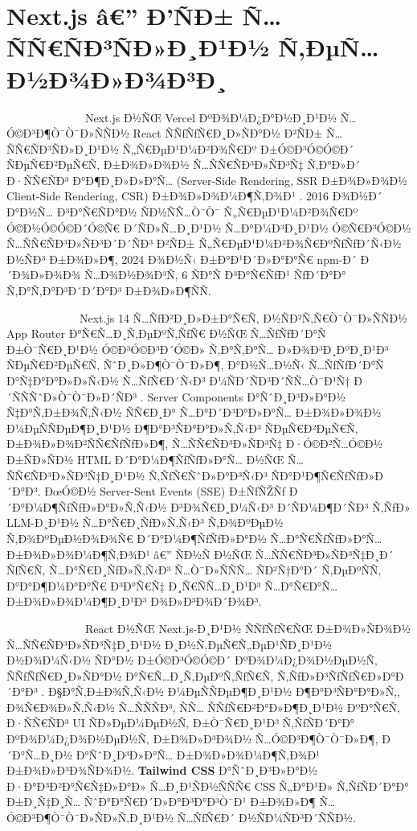 \documentclass[12pt,A4]{report}
\begin{document}
\section{Next.js â€” Ð’ÑÐ± Ñ…ÑÑ€ÑÐ³ÑÐ»Ð¸Ð¹Ð½ Ñ‚ÐµÑ…Ð½Ð¾Ð»Ð¾Ð³Ð¸}

\ \ \ \ \ \ \ \ \  \ \ \ \ \ Next.js Ð½ÑŒ Vercel ÐºÐ¾Ð¼Ð¿Ð°Ð½Ð¸Ð¹Ð½ Ñ…Ó©Ð³Ð¶Ò¯Ò¯Ð»ÑÑÐ½
React ÑÑƒÑƒÑ€Ð¸Ð»ÑÐ°Ð½ Ð²ÑÐ± Ñ…ÑÑ€ÑÐ³ÑÐ»Ð¸Ð¹Ð½ Ñ„Ñ€ÐµÐ¹Ð¼Ð²Ð¾Ñ€Ðº Ð±Ó©Ð³Ó©Ó©Ð´ ÑÐµÑ€Ð²ÐµÑ€Ñ‚ Ð±Ð¾Ð»Ð¾Ð½
Ñ…ÑÑ€ÑÐ³Ð»ÑÐ³Ñ‡ Ñ‚Ð°Ð»Ð´ Ð·ÑÑ€ÑÐ³ Ð°Ð¶Ð¸Ð»Ð»Ð°Ñ… (Server-Side Rendering, SSR Ð±Ð¾Ð»Ð¾Ð½
Client-Side Rendering, CSR) Ð±Ð¾Ð»Ð¾Ð¼Ð¶Ñ‚Ð¾Ð¹ \cite{nextjs2024}. 2016 Ð¾Ð½Ð´
Ð°Ð½Ñ… Ð³Ð°Ñ€ÑÐ°Ð½ ÑÐ½ÑÑ…Ò¯Ò¯ Ñ„Ñ€ÐµÐ¹Ð¼Ð²Ð¾Ñ€Ðº Ó©Ð½Ó©Ó©Ð´Ó©Ñ€ Ð´ÑÐ»Ñ…Ð¸Ð¹Ð½ Ñ…Ð°Ð¼Ð³Ð¸Ð¹Ð½ Ó©Ñ€Ð³Ó©Ð½
Ñ…ÑÑ€ÑÐ³Ð»ÑÐ³Ð´Ð´ÑÐ³ Ð²ÑÐ± Ñ„Ñ€ÐµÐ¹Ð¼Ð²Ð¾Ñ€ÐºÑƒÑƒÐ´Ñ‹Ð½ Ð½ÑÐ³ Ð±Ð¾Ð»Ð¶, 2024 Ð¾Ð½Ñ‹ Ð±Ð°Ð¹Ð´Ð»Ð°Ð°Ñ€
npm-Ð´ Ð´Ð¾Ð»Ð¾Ð¾ Ñ…Ð¾Ð½Ð¾Ð³Ñ‚ 6 ÑÐ°Ñ Ð³Ð°Ñ€ÑƒÐ¹ ÑƒÐ´Ð°Ð° Ñ‚Ð°Ñ‚Ð°Ð³Ð´Ð´Ð°Ð³ Ð±Ð¾Ð»Ð¶ÑÑ.

\ \ \ \ \ \ \ \ \  \ \ \ \ Next.js 14 Ñ…ÑƒÐ²Ð¸Ð»Ð±Ð°Ñ€Ñ‚ Ð½ÑÐ²Ñ‚Ñ€Ò¯Ò¯Ð»ÑÑÐ½
App Router Ð°Ñ€Ñ…Ð¸Ñ‚ÐµÐºÑ‚ÑƒÑ€ Ð½ÑŒ Ñ…ÑƒÑƒÐ´Ð°Ñ Ð±Ò¯Ñ€Ð¸Ð¹Ð½ Ó©Ð³Ó©Ð³Ð´Ó©Ð» Ñ‚Ð°Ñ‚Ð°Ñ…
Ð»Ð¾Ð³Ð¸ÐºÐ¸Ð¹Ð³ ÑÐµÑ€Ð²ÐµÑ€Ñ‚ ÑˆÐ¸Ð»Ð¶Ò¯Ò¯Ð»Ð¶, Ð°Ð½Ñ…Ð½Ñ‹ Ñ…ÑƒÑƒÐ´Ð°Ñ Ð°Ñ‡Ð°Ð°Ð»Ð»Ñ‹Ð½ Ñ…ÑƒÑ€Ð´Ñ‹Ð³ Ð¼ÑÐ´ÑÐ³Ð´ÑÑ…Ò¯Ð¹Ñ†
Ð´ÑÑÑˆÐ»Ò¯Ò¯Ð»Ð´ÑÐ³ \cite{nextjs2024}. Server Components Ð°ÑˆÐ¸Ð³Ð»Ð°Ð½ Ñ‡Ð°Ñ‚Ð±Ð¾Ñ‚Ñ‹Ð½
ÑÑ€Ð¸Ð° Ñ…Ð°Ð´Ð³Ð°Ð»Ð°Ñ… Ð±Ð¾Ð»Ð¾Ð½ Ð¼ÐµÑÑÐµÐ¶Ð¸Ð¹Ð½ Ð¶Ð°Ð³ÑÐ°Ð°Ð»Ñ‚Ñ‹Ð³ ÑÐµÑ€Ð²ÐµÑ€Ñ‚ Ð±Ð¾Ð»Ð¾Ð²ÑÑ€ÑƒÑƒÐ»Ð¶,
Ñ…ÑÑ€ÑÐ³Ð»ÑÐ³Ñ‡ Ð·Ó©Ð²Ñ…Ó©Ð½ Ð±ÑÐ»ÑÐ½ HTML Ð´Ð°Ð¼Ð¶ÑƒÑƒÐ»Ð°Ñ… Ð½ÑŒ Ñ…ÑÑ€ÑÐ³Ð»ÑÐ³Ñ‡Ð¸Ð¹Ð½ Ñ‚ÑƒÑ€ÑˆÐ»Ð°Ð³Ñ‹Ð³
ÑÐ°Ð¹Ð¶Ñ€ÑƒÑƒÐ»Ð´Ð°Ð³. ÐœÓ©Ð½ Server-Sent Events (SSE) Ð±ÑƒÑŽÑƒ Ð´Ð°Ð¼Ð¶ÑƒÑƒÐ»Ð°Ð»Ñ‚Ñ‹Ð½
Ð³Ð¾Ñ€Ð¸Ð¼Ñ‹Ð³ Ð´ÑÐ¼Ð¶Ð´ÑÐ³ Ñ‚ÑƒÐ» LLM-Ð¸Ð¹Ð½ Ñ…Ð°Ñ€Ð¸ÑƒÐ»Ñ‚Ñ‹Ð³ Ñ‚Ð¾ÐºÐµÐ½ Ñ‚Ð¾ÐºÐµÐ½Ð¾Ð¾Ñ€ Ð´Ð°Ð¼Ð¶ÑƒÑƒÐ»Ð°Ð½
Ñ…Ð°Ñ€ÑƒÑƒÐ»Ð°Ñ… Ð±Ð¾Ð»Ð¾Ð¼Ð¶Ñ‚Ð¾Ð¹ â€” ÑÐ½Ñ Ð½ÑŒ Ñ…ÑÑ€ÑÐ³Ð»ÑÐ³Ñ‡Ð¸Ð´ ÑƒÑ€Ñ‚ Ñ…Ð°Ñ€Ð¸ÑƒÐ»Ñ‚Ñ‹Ð³ Ñ…Ò¯Ð»ÑÑÑ… ÑÐ²Ñ†Ð°Ð´
Ñ‚ÐµÐºÑÑ‚ Ð°Ð°Ð¶Ð¼Ð°Ð°Ñ€ Ð³Ð°Ñ€Ñ‡ Ð¸Ñ€ÑÑ…Ð¸Ð¹Ð³ Ñ…Ð°Ñ€Ð°Ñ… Ð±Ð¾Ð»Ð¾Ð¼Ð¶Ð¸Ð¹Ð³ Ð¾Ð»Ð³Ð¾Ð´Ð¾Ð³.

\ \ \ \ \ \ \ \ \  \ \ \ \ \ React Ð½ÑŒ Next.js-Ð¸Ð¹Ð½ ÑÑƒÑƒÑ€ÑŒ Ð±Ð¾Ð»ÑÐ¾Ð½
Ñ…ÑÑ€ÑÐ³Ð»ÑÐ³Ñ‡Ð¸Ð¹Ð½ Ð¸Ð½Ñ‚ÐµÑ€Ñ„ÐµÐ¹ÑÐ¸Ð¹Ð½ Ð½Ð¾Ð¼Ñ‹Ð½ ÑÐ°Ð½ Ð±Ó©Ð³Ó©Ó©Ð´ ÐºÐ¾Ð¼Ð¿Ð¾Ð½ÐµÐ½Ñ‚ ÑÑƒÑƒÑ€Ð¸Ð»ÑÐ°Ð½
Ð°Ñ€Ñ…Ð¸Ñ‚ÐµÐºÑ‚ÑƒÑ€Ñ‚ Ñ‚ÑƒÐ»Ð³ÑƒÑƒÑ€Ð»Ð°Ð´Ð°Ð³ \cite{react2024}. Ð§Ð°Ñ‚Ð±Ð¾Ñ‚Ñ‹Ð½ Ð¼ÐµÑÑÐµÐ¶Ð¸Ð¹Ð½ Ð¶Ð°Ð³ÑÐ°Ð°Ð»Ñ‚,
Ð¾Ñ€Ð¾Ð»Ñ‚Ñ‹Ð½ Ñ…ÑÑÑÐ³, ÑÑ… ÑÑƒÑ€Ð²Ð°Ð»Ð¶Ð¸Ð¹Ð½ ÐºÐ°Ñ€Ñ‚ Ð·ÑÑ€ÑÐ³ UI ÑÐ»ÐµÐ¼ÐµÐ½Ñ‚ Ð±Ò¯Ñ€Ð¸Ð¹Ð³ Ñ‚ÑƒÑÐ´Ð°Ð°
ÐºÐ¾Ð¼Ð¿Ð¾Ð½ÐµÐ½Ñ‚ Ð±Ð¾Ð»Ð³Ð¾Ð½ Ñ…Ó©Ð³Ð¶Ò¯Ò¯Ð»Ð¶, Ð´Ð°Ñ…Ð¸Ð½ Ð°ÑˆÐ¸Ð³Ð»Ð°Ñ… Ð±Ð¾Ð»Ð¾Ð¼Ð¶Ñ‚Ð¾Ð¹ Ð±Ð¾Ð»Ð³Ð¾ÑÐ¾Ð½.
\textbf{Tailwind CSS} Ð°ÑˆÐ¸Ð³Ð»Ð°Ð½ Ð·Ð°Ð³Ð²Ð°Ñ€Ñ‡Ð»Ð°Ð» Ñ…Ð¸Ð¹ÑÐ½ÑÑÑ€ CSS Ñ„Ð°Ð¹Ð» Ñ‚ÑƒÑÐ´Ð°Ð°
Ð±Ð¸Ñ‡Ð¸Ñ… ÑˆÐ°Ð°Ñ€Ð´Ð»Ð°Ð³Ð°Ð³Ò¯Ð¹ Ð±Ð¾Ð»Ð¶ Ñ…Ó©Ð³Ð¶Ò¯Ò¯Ð»ÑÐ»Ñ‚Ð¸Ð¹Ð½ Ñ…ÑƒÑ€Ð´ Ð½ÑÐ¼ÑÐ³Ð´ÑÑÐ½.
\end{document}
